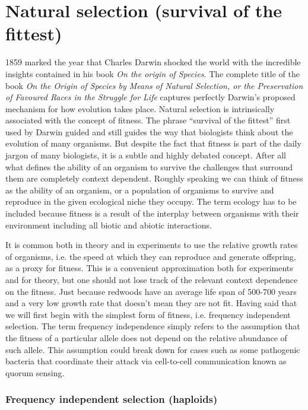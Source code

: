 \section{Natural selection (survival of the fittest)}
\label{sec_selection}
1859 marked the year that Charles Darwin shocked the world with the incredible
insights contained in his book \textit{On the origin of Species}. The complete
title of the book \textit{On the Origin of Species by Means of Natural
Selection, or the Preservation of Favoured Races in the Struggle for Life}
captures perfectly Darwin's proposed mechanism for how evolution takes place.
Natural selection is intrinsically associated with the concept of fitness. The
phrase ``survival of the fittest'' first used by Darwin guided and still guides
the way that biologists think about the evolution of many organisms. But despite
the fact that fitness is part of the daily jargon of many biologists, it is a
subtle and highly debated concept. After all what defines the ability of an
organism to survive the challenges that surround them are completely context
dependent. Roughly speaking we can think of fitness as the ability of an
organism, or a population of organisms to survive and reproduce in the given
ecological niche they occupy. The term ecology has to be included because
fitness is a result of the interplay between organisms with their environment
including all biotic and abiotic interactions. 

It is common both in theory and in experiments to use the relative growth rates
of organisms, i.e. the speed at which they can reproduce and generate
offspring, as a proxy for fitness. This is a convenient approximation both
for experiments and for theory, but one should not lose track of the relevant
context dependence on the fitness. Just because redwoods have an average life
span of 500-700 years and a very low growth rate that doesn't mean they are not
fit. Having said that we will first begin with the simplest form of fitness,
i.e. frequency independent selection. The term frequency independence simply
refers to the assumption that the fitness of a particular allele does not
depend on the relative abundance of such allele. This assumption could break
down for cases such as some pathogenic bacteria that coordinate their attack
via cell-to-cell communication known as quorum sensing. 

\subsubsection{Frequency independent selection (haploids)}

